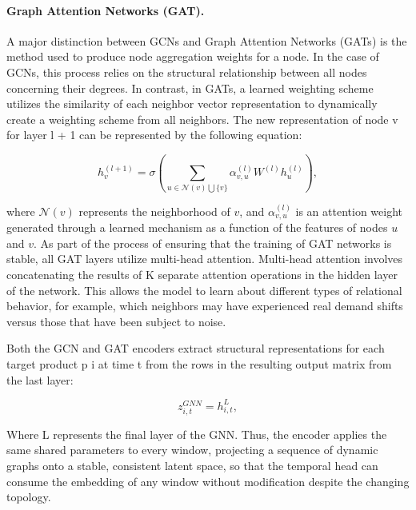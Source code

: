 \paragraph{Graph Attention Networks (GAT).}
A major distinction between GCNs and Graph Attention Networks (GATs) is the method used to produce node aggregation weights for a node. In the case of GCNs, this process relies on the structural relationship between all nodes concerning their degrees. In contrast, in GATs, a learned weighting scheme utilizes the similarity of each neighbor vector representation to dynamically create a weighting scheme from all neighbors. The new representation of node v for layer l + 1 can be represented by the following equation:

\begin{equation}
h_v^{(l+1)}=
\sigma \left (
\sum _{ u \in \mathcal { N } ( v ) \bigcup \{ v \}} 
\alpha _{{ v , u }}^{\left( l \right) } W ^ {\left( l \right) } h_{{ u }}^{\left( l \right) }
\right ),
\label{eq:gat_update}
\end{equation}

where \(\mathcal { N }( v )\) represents the neighborhood of \(v\), and \(\alpha _{{ v , u }}^{\left( l \right) }\) is an attention weight generated through a learned mechanism as a function of the features of nodes \(u\) and \(v\). As part of the process of ensuring that the training of GAT networks is stable, all GAT layers utilize multi-head attention. Multi-head attention involves concatenating the results of K separate attention operations in the hidden layer of the network. This allows the model to learn about different types of relational behavior, for example, which neighbors may have experienced real demand shifts versus those that have been subject to noise.

Both the GCN and GAT encoders extract structural representations for each target product p i at time t from the rows in the resulting output matrix from the last layer:

\begin{equation}
z_{{ i , t }}^ {{ GNN }}=h_{{ i , t }}^{{ L }},
\label{eq:target_node_embedding}
\end{equation}

Where L represents the final layer of the GNN. Thus, the encoder applies the same shared parameters to every window, projecting a sequence of dynamic graphs onto a stable, consistent latent space, so that the temporal head can consume the embedding of any window without modification despite the changing topology.

